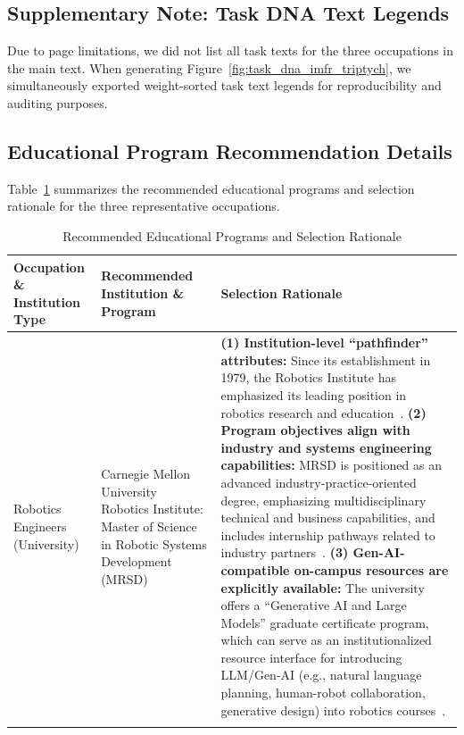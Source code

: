 \begin{appendices}
\subsection{Supplementary Note: Task DNA Text Legends}
\label{app:task_dna_figures}

Due to page limitations, we did not list all task texts for the three occupations in the main text. When generating Figure~\ref{fig:task_dna_imfr_triptych}, we simultaneously exported weight-sorted task text legends for reproducibility and auditing purposes.

\subsection{Educational Program Recommendation Details}
\label{app:program_recommendations}

Table~\ref{tab:programs_genai_rationale} summarizes the recommended educational programs and selection rationale for the three representative occupations.

\begin{table}[H]
\centering
\renewcommand{\arraystretch}{1.3}
\small
\caption{Recommended Educational Programs and Selection Rationale}
\label{tab:programs_genai_rationale}
\begin{tabular}{@{}p{}p{}p{}@{}}
\toprule
\textbf{Occupation \& Institution Type} & \textbf{Recommended Institution \& Program} & \textbf{Selection Rationale} \\
\midrule

Robotics Engineers \newline(University) &
Carnegie Mellon University\newline
Robotics Institute: Master of Science in Robotic Systems Development (MRSD) &
\textbf{(1) Institution-level ``pathfinder'' attributes:} Since its establishment in 1979, the Robotics Institute has emphasized its leading position in robotics research and education~\cite{cmu_ri_2026}.\newline
\textbf{(2) Program objectives align with industry and systems engineering capabilities:} MRSD is positioned as an advanced industry-practice-oriented degree, emphasizing multidisciplinary technical and business capabilities, and includes internship pathways related to industry partners~\cite{cmu_mrsd_2026}.\newline
\textbf{(3) Gen-AI-compatible on-campus resources are explicitly available:} The university offers a ``Generative AI and Large Models'' graduate certificate program, which can serve as an institutionalized resource interface for introducing LLM/Gen-AI (e.g., natural language planning, human-robot collaboration, generative design) into robotics courses~\cite{cmu_gai_cert_2026}. \\
\addlinespace


\end{tabular}
\end{table}
\end{appendices}
